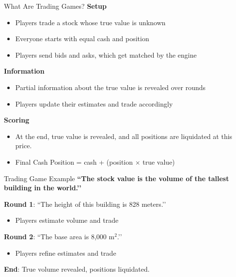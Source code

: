 \begin{frame}{What Are Trading Games?}
  \textbf{Setup}
  \begin{itemize}
    \item Players trade a stock whose true value is unknown
    \item Everyone starts with equal cash and position
    \item Players send bids and asks, which get matched by the engine
  \end{itemize}

  \vspace{0.3cm}
  \textbf{Information}
  \begin{itemize}
    \item Partial information about the true value is revealed over rounds
    \item Players update their estimates and trade accordingly
  \end{itemize}

  \vspace{0.3cm}
  \textbf{Scoring}
  \begin{itemize}
    \item At the end, true value is revealed, and all positions are liquidated at this price.
    \item Final Cash Position = cash + (position $\times$ true value)
  \end{itemize}
\end{frame}

\begin{frame}{Trading Game Example}
  \textbf{``The stock value is the volume of the tallest building in the world.’’}

  \vspace{0.3cm}
  \textbf{Round 1}: ``The height of this building is 828 meters.’’
  \begin{itemize}
    \item Players estimate volume and trade
  \end{itemize}

  \vspace{0.3cm}
  \textbf{Round 2}: ``The base area is 8,000 m$^2$.’’
  \begin{itemize}
    \item Players refine estimates and trade
  \end{itemize}

  \vspace{0.3cm}
  \textbf{End}: True volume revealed, positions liquidated.
\end{frame}

